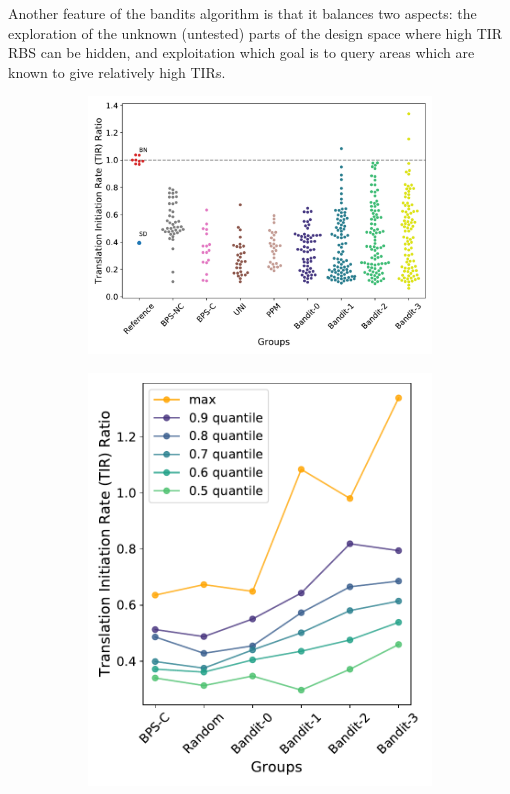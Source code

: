 \documentclass{article}
\begin{document}
Another feature of the bandits algorithm is that it balances two aspects: the exploration of the unknown (untested) parts of the design space where high TIR RBS can be hidden, and exploitation which goal is to query areas which are known to give relatively high TIRs.\\

\begin{figure}[!ht]
    \centering
    \begin{subfigure}[b]{0.48\textwidth}
        \centering
        \caption{}
        \includegraphics[scale=0.35]{plots/Main_Paper/swarmplot.pdf}
    \end{subfigure}
    \begin{subfigure}[b]{0.25\textwidth}
        \centering
        \caption{}
        \includegraphics[scale=0.35]{plots/Main_Paper/quantplot.pdf}

\end{subfigure}
\end{figure}
\end{document}
